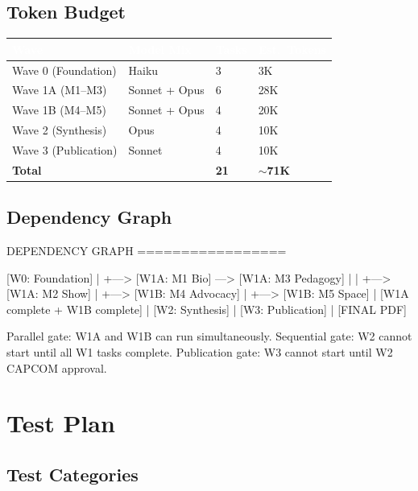 \documentclass[11pt,letterpaper]{article}
\newcommand{\tableheader}[1]{\textbf{\sffamily\textcolor{white}{#1}}}
\begin{document}
\subsection{Token Budget}

\begin{center}
\begin{tabularx}{\textwidth}{L{3cm}L{2cm}C{2cm}C{2cm}}
\toprule
{}
\tableheader{Wave} & \tableheader{Model Mix} & \tableheader{Tasks} & \tableheader{Est.~Tokens} \\
\midrule
Wave 0 (Foundation) & Haiku & 3 & 3K \\
Wave 1A (M1--M3) & Sonnet + Opus & 6 & 28K \\
Wave 1B (M4--M5) & Sonnet + Opus & 4 & 20K \\
Wave 2 (Synthesis) & Opus & 4 & 10K \\
Wave 3 (Publication) & Sonnet & 4 & 10K \\
\midrule
\textbf{Total} & & \textbf{21} & \textbf{$\sim$71K} \\
\bottomrule
\end{tabularx}
\end{center}

\subsection{Dependency Graph}

\begin{asciibox}
DEPENDENCY GRAPH
=================

[W0: Foundation]
     |
     +---> [W1A: M1 Bio] ---> [W1A: M3 Pedagogy]
     |         |
     +---> [W1A: M2 Show]
     |
     +---> [W1B: M4 Advocacy]
     |
     +---> [W1B: M5 Space]
          |
          [W1A complete + W1B complete]
                    |
               [W2: Synthesis]
                    |
              [W3: Publication]
                    |
               [FINAL PDF]

Parallel gate: W1A and W1B can run simultaneously.
Sequential gate: W2 cannot start until all W1 tasks complete.
Publication gate: W3 cannot start until W2 CAPCOM approval.
\end{asciibox}

\section{Test Plan}

\subsection{Test Categories}
\end{document}
